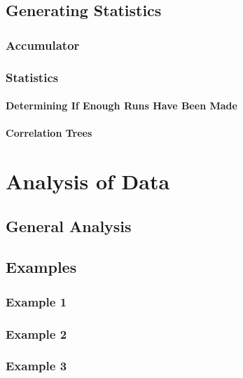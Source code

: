 \documentclass[12pt,twoside]{book}
\begin{document}
\section{Generating Statistics}

\subsection{Accumulator}

\subsection{Statistics}

\subsubsection{Determining If Enough Runs Have Been Made}

\subsubsection{Correlation Trees}

%
%

\chapter{Analysis of Data}

\section{General Analysis}

\section{Examples}

\subsection{Example 1}

\subsection{Example 2}

\subsection{Example 3}
\end{document}
